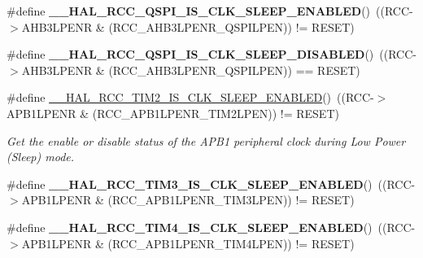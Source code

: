 \begin{DoxyCompactItemize}
\#define {\bfseries \+\_\+\+\_\+\+H\+A\+L\+\_\+\+R\+C\+C\+\_\+\+Q\+S\+P\+I\+\_\+\+I\+S\+\_\+\+C\+L\+K\+\_\+\+S\+L\+E\+E\+P\+\_\+\+E\+N\+A\+B\+L\+ED}()~((R\+CC-\/$>$A\+H\+B3\+L\+P\+E\+NR \& (R\+C\+C\+\_\+\+A\+H\+B3\+L\+P\+E\+N\+R\+\_\+\+Q\+S\+P\+I\+L\+P\+EN)) != R\+E\+S\+ET)
\item 
\mbox{\label{group___r_c_c___clock___sleep___enable___disable___status_ga54b93ecc117368deda75a46dd019df49}} 
\#define {\bfseries \+\_\+\+\_\+\+H\+A\+L\+\_\+\+R\+C\+C\+\_\+\+Q\+S\+P\+I\+\_\+\+I\+S\+\_\+\+C\+L\+K\+\_\+\+S\+L\+E\+E\+P\+\_\+\+D\+I\+S\+A\+B\+L\+ED}()~((R\+CC-\/$>$A\+H\+B3\+L\+P\+E\+NR \& (R\+C\+C\+\_\+\+A\+H\+B3\+L\+P\+E\+N\+R\+\_\+\+Q\+S\+P\+I\+L\+P\+EN)) == R\+E\+S\+ET)
\item 
\#define \mbox{\hyperlink{group___r_c_c___clock___sleep___enable___disable___status_gaf38181befdeecf6a61c03885d3645bf1}{\+\_\+\+\_\+\+H\+A\+L\+\_\+\+R\+C\+C\+\_\+\+T\+I\+M2\+\_\+\+I\+S\+\_\+\+C\+L\+K\+\_\+\+S\+L\+E\+E\+P\+\_\+\+E\+N\+A\+B\+L\+ED}}()~((R\+CC-\/$>$A\+P\+B1\+L\+P\+E\+NR \& (R\+C\+C\+\_\+\+A\+P\+B1\+L\+P\+E\+N\+R\+\_\+\+T\+I\+M2\+L\+P\+EN)) != R\+E\+S\+ET)
\begin{DoxyCompactList}\small\item\em Get the enable or disable status of the A\+P\+B1 peripheral clock during Low Power (Sleep) mode. \end{DoxyCompactList}\item 
\mbox{\label{group___r_c_c___clock___sleep___enable___disable___status_gabe8c0a343d9bb288dae09aadbab028a6}} 
\#define {\bfseries \+\_\+\+\_\+\+H\+A\+L\+\_\+\+R\+C\+C\+\_\+\+T\+I\+M3\+\_\+\+I\+S\+\_\+\+C\+L\+K\+\_\+\+S\+L\+E\+E\+P\+\_\+\+E\+N\+A\+B\+L\+ED}()~((R\+CC-\/$>$A\+P\+B1\+L\+P\+E\+NR \& (R\+C\+C\+\_\+\+A\+P\+B1\+L\+P\+E\+N\+R\+\_\+\+T\+I\+M3\+L\+P\+EN)) != R\+E\+S\+ET)
\item 
\mbox{\label{group___r_c_c___clock___sleep___enable___disable___status_ga57a6fc55a53a8c9d8cc0303ec5d7177e}} 
\#define {\bfseries \+\_\+\+\_\+\+H\+A\+L\+\_\+\+R\+C\+C\+\_\+\+T\+I\+M4\+\_\+\+I\+S\+\_\+\+C\+L\+K\+\_\+\+S\+L\+E\+E\+P\+\_\+\+E\+N\+A\+B\+L\+ED}()~((R\+CC-\/$>$A\+P\+B1\+L\+P\+E\+NR \& (R\+C\+C\+\_\+\+A\+P\+B1\+L\+P\+E\+N\+R\+\_\+\+T\+I\+M4\+L\+P\+EN)) != R\+E\+S\+ET)
\item 

\end{DoxyCompactItemize}
